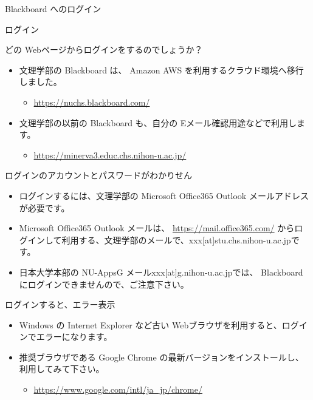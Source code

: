 \documentclass[a4j,10pt]{jsarticle}
\def\lthtmlcheckvsize{\ifdim\ht\sizebox<\vsize 
  \ifdim\wd\sizebox<\hsize\expandafter\hfill\fi \expandafter\vfill
  \else\expandafter\vss\fi}%
\begin{document}
{\newpage\clearpage
{}%
\begin{frame}[label={sec:org92b203c},fragile]{Blackboard へのログイン}
\begin{block}{ログイン}
\begin{block}{どの Webページからログインをするのでしょうか？}
\begin{itemize}
\item 文理学部の Blackboard は、 Amazon AWS を利用するクラウド環境へ移行しました。
\begin{itemize}
\item \url{https://nuchs.blackboard.com/}
\end{itemize}
\par
\item 文理学部の以前の Blackboard も、自分の Eメール確認用途などで利用します。
\begin{itemize}
\item \url{https://minerva3.educ.chs.nihon-u.ac.jp/}
\end{itemize}
\end{itemize}
\end{block}
\par
\begin{block}{ログインのアカウントとパスワードがわかりせん}
\begin{itemize}
\item ログインするには、文理学部の Microsoft Office365 Outlook メールアドレスが必要です。
\item Microsoft Office365 Outlook メールは、 \url{https://mail.office365.com/} からログインして利用する、文理学部のメールで、xxx[at]stu.chs.nihon-u.ac.jpです。
\item 日本大学本部の NU-AppsG メールxxx[at]g.nihon-u.ac.jpでは、 Blackboard にログインできませんので、ご注意下さい。
\end{itemize}
\end{block}
\par
\begin{block}{ログインすると、エラー表示}
\begin{itemize}
\item Windows の Internet Explorer など古い Webブラウザを利用すると、ログインでエラーになります。
\item 推奨ブラウザである Google Chrome の最新バージョンをインストールし、利用してみて下さい。
\begin{itemize}
\item \url{https://www.google.com/intl/ja\_jp/chrome/}
\end{itemize}
\end{itemize}
\end{block}
\end{block}
\end{frame}%
\lthtmlfigureZ
\lthtmlcheckvsize\clearpage}
\end{document}
